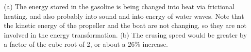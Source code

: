         (a) The energy stored in the gasoline is being changed
        into heat via frictional heating, and also probably into   
        sound and into energy of water waves. Note that the kinetic
        energy of the propeller and the boat are not changing, so they
        are not involved in the energy transformation. (b) The
        crusing speed would be greater by a factor of the cube root
        of 2, or about a 26\% increase.
